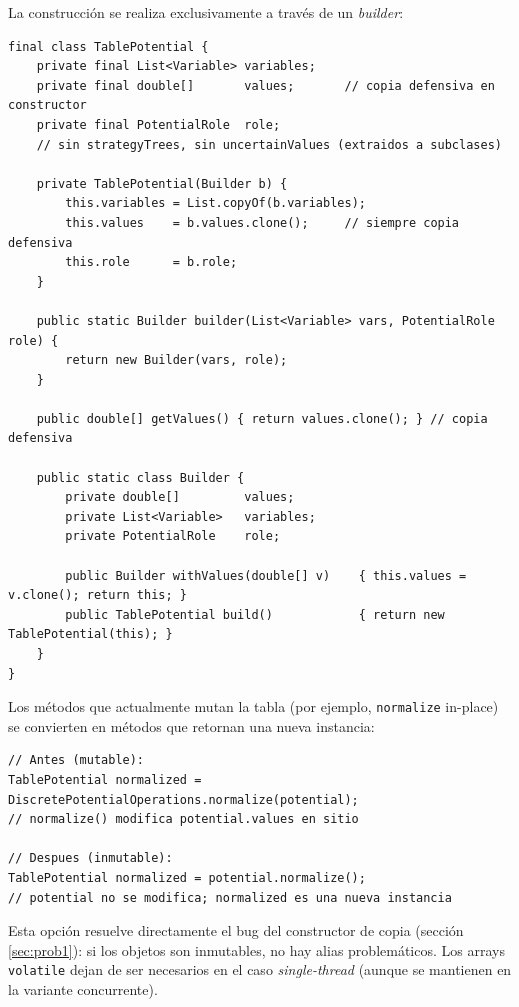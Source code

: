 \documentclass[11pt,a4paper]{article}
\newcommand{\code}[1]{\texttt{#1}}
\begin{document}
La construcción se realiza exclusivamente a través de un \emph{builder}:

\begin{lstlisting}[caption={Builder para \code{TablePotential} inmutable}]
final class TablePotential {
    private final List<Variable> variables;
    private final double[]       values;       // copia defensiva en constructor
    private final PotentialRole  role;
    // sin strategyTrees, sin uncertainValues (extraidos a subclases)

    private TablePotential(Builder b) {
        this.variables = List.copyOf(b.variables);
        this.values    = b.values.clone();     // siempre copia defensiva
        this.role      = b.role;
    }

    public static Builder builder(List<Variable> vars, PotentialRole role) {
        return new Builder(vars, role);
    }

    public double[] getValues() { return values.clone(); } // copia defensiva

    public static class Builder {
        private double[]         values;
        private List<Variable>   variables;
        private PotentialRole    role;

        public Builder withValues(double[] v)    { this.values = v.clone(); return this; }
        public TablePotential build()            { return new TablePotential(this); }
    }
}
\end{lstlisting}

Los métodos que actualmente mutan la tabla (por ejemplo, \code{normalize} in-place)
se convierten en métodos que retornan una nueva instancia:

\begin{lstlisting}[caption={Normalización devuelve nueva instancia en lugar de mutar}]
// Antes (mutable):
TablePotential normalized = DiscretePotentialOperations.normalize(potential);
// normalize() modifica potential.values en sitio

// Despues (inmutable):
TablePotential normalized = potential.normalize();
// potential no se modifica; normalized es una nueva instancia
\end{lstlisting}

Esta opción resuelve directamente el bug del constructor de copia (sección
\ref{sec:prob1}): si los objetos son inmutables, no hay alias problemáticos.
Los arrays \code{volatile} dejan de ser necesarios en el caso \emph{single-thread}
(aunque se mantienen en la variante concurrente).
\end{document}
